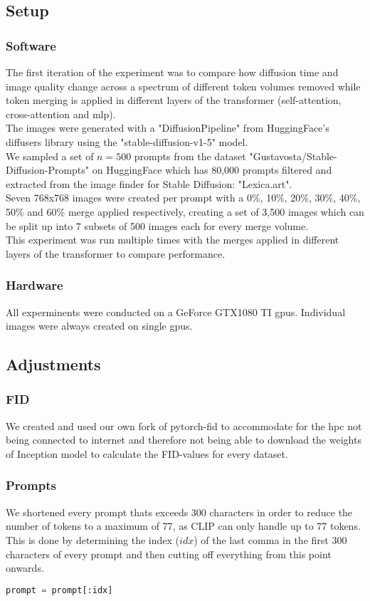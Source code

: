 \documentclass{article}
\begin{document}
\subsection{Setup}
\subsubsection*{Software}
The first iteration of the experiment was to compare how diffusion time and image quality change across a spectrum of different token volumes removed while token merging is applied in different layers of the transformer (self-attention, cross-attention and mlp).\\
The images were generated with a "DiffusionPipeline" from HuggingFace's diffusers library using the "stable-diffusion-v1-5" model\cite{Rombach_2022_CVPR}.\\
We sampled a set of \(n=500\) prompts from the dataset "Gustavosta/Stable-Diffusion-Prompts" on HuggingFace which has 80,000 prompts filtered and extracted from the image finder for Stable Diffusion: "Lexica.art".\\
Seven 768x768 images were created per prompt with a 0\%, 10\%, 20\%, 30\%, 40\%, 50\% and 60\% merge applied respectively, creating a set of 3,500 images which can be split up into 7 subsets of 500 images each for every merge volume.\\
This experiment was run multiple times with the merges applied in different layers of the transformer to compare performance.
\subsubsection*{Hardware}
All experminents were conducted on a GeForce GTX1080 TI gpus. Individual images were always created on single gpus.

\subsection{Adjustments}
\subsubsection*{FID}
We created and used our own fork of pytorch-fid\cite{Seitzer2020FID} to accommodate for the hpc not being connected to internet and therefore not being able to download the weights of Inception model to calculate the FID-values for every dataset. 
\subsubsection*{Prompts}
We shortened every prompt thats exceeds 300 characters in order to reduce the number of tokens to a maximum of 77, as CLIP\cite{radford2021learning} can only handle up to 77 tokens.\\
This is done by determining the index (\(idx\)) of the last comma in the first 300 characters of every prompt and then cutting off everything from this point onwards.
\begin{lstlisting}[language=Python]
prompt = prompt[:idx]
\end{lstlisting}
\end{document}
